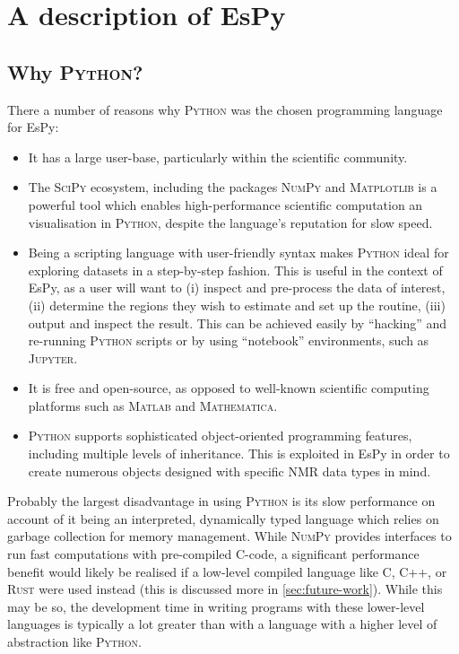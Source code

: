 \section{A description of \acs{EsPy}}

\subsection{Why \textsc{Python}?}
There a number of reasons why \textsc{Python} was the chosen programming
language for \ac{EsPy}:
\begin{itemize}
    \item It has a large user-base, particularly within the scientific
        community.
    \item The \textsc{SciPy} ecosystem\cite{Virtanen2020}, including the packages
        \textsc{NumPy}\cite{Harris2020} and
        \textsc{Matplotlib}\cite{Hunter2007} is a powerful tool which enables
        high-performance scientific computation an visualisation in
        \textsc{Python}, despite the language's reputation for slow speed.
    \item Being a scripting language with user-friendly syntax makes
        \textsc{Python} ideal for exploring datasets in a step-by-step fashion.
        This is useful in the context of \ac{EsPy}, as a user will want to
        (i) inspect and pre-process the data of interest,
        (ii) determine the regions they wish to estimate and set up the
        routine,
        (iii) output and inspect the result.
        This can be achieved easily by ``hacking'' and re-running
        \textsc{Python} scripts or by using ``notebook'' environments, such as
        \textsc{Jupyter}.
    \item It is free and open-source, as opposed to well-known scientific
        computing platforms such as \textsc{Matlab} and \textsc{Mathematica}.
    \item \textsc{Python} supports sophisticated object-oriented programming
        features, including multiple levels of inheritance. This is exploited in
        \ac{EsPy} in order to create numerous objects designed with specific
        \ac{NMR} data types in mind.
\end{itemize}

Probably the largest disadvantage in using \textsc{Python} is its slow performance on
account of it being an interpreted, dynamically typed language which relies on
garbage collection for memory management. While \textsc{NumPy} provides
interfaces to run fast computations with pre-compiled C-code, a significant
performance benefit would likely be realised if a low-level compiled language
like C, C++, or \textsc{Rust} were used instead (this is discussed more in
\cref{sec:future-work}). While this may be so, the
development time in writing programs with these lower-level languages is
typically a lot greater than with a language with a higher level of abstraction
like \textsc{Python}.

